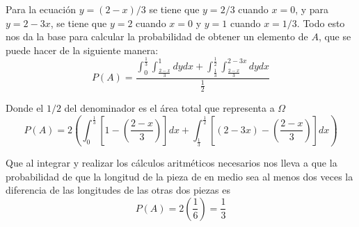 Para la ecuación $y= (2-x)/3$ se tiene que $y = 2/3$ cuando $x = 0$, y para $y= 2-3x$, se tiene que $y = 2$ cuando $x = 0$ y $y=1$ cuando $x =1/3$. Todo esto nos da la base para calcular la probabilidad de obtener un elemento de $A$, que se puede hacer de la siguiente manera:
\begin{equation*}
    P(A) = \frac{\int_{0}^{\frac{1}{3}}\int_{\frac{2-x}{3}}^{1}dydx+\int_{\frac{1}{3}}^{\frac{1}{2}}\int_{\frac{2-x}{3}}^{2-3x}dydx}{\frac{1}{2}}
\end{equation*}

Donde el $1/2$ del denominador es el área total que representa a $\Omega$
\begin{equation*}
    P(A) =2\left(\int_{0}^{\frac{1}{3}}\left[1-\left(\frac{2-x}{3}\right)\right] dx + \int_{\frac{1}{3}}^{\frac{1}{2}}\left[(2-3x)-\left(\frac{2-x}{3}\right)\right]dx\right)
\end{equation*}

Que al integrar y realizar los cálculos aritméticos necesarios nos lleva a que la probabilidad de que la longitud de la pieza de en medio sea al menos dos veces la diferencia de las longitudes de las otras dos piezas es
\begin{equation*}
    P(A) = 2\left(\frac{1}{6}\right) = \frac{1}{3}
\end{equation*}
